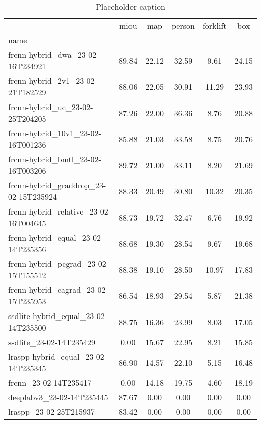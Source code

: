 \begin{table}[H]
\centering
\caption{Placeholder caption}
\label{tab:test-set}
\begin{tabular}{lccccc}
\toprule
 & miou & map & person & forklift & box \\
name &  &  &  &  &  \\
\midrule
frcnn-hybrid_dwa_23-02-16T234921 & 89.84 & 22.12 & 32.59 & 9.61 & 24.15 \\
frcnn-hybrid_2v1_23-02-21T182529 & 88.06 & 22.05 & 30.91 & 11.29 & 23.93 \\
frcnn-hybrid_uc_23-02-25T204205 & 87.26 & 22.00 & 36.36 & 8.76 & 20.88 \\
frcnn-hybrid_10v1_23-02-16T001236 & 85.88 & 21.03 & 33.58 & 8.75 & 20.76 \\
frcnn-hybrid_bmtl_23-02-16T003206 & 89.72 & 21.00 & 33.11 & 8.20 & 21.69 \\
frcnn-hybrid_graddrop_23-02-15T235924 & 88.33 & 20.49 & 30.80 & 10.32 & 20.35 \\
frcnn-hybrid_relative_23-02-16T004645 & 88.73 & 19.72 & 32.47 & 6.76 & 19.92 \\
frcnn-hybrid_equal_23-02-14T235356 & 88.68 & 19.30 & 28.54 & 9.67 & 19.68 \\
frcnn-hybrid_pcgrad_23-02-15T155512 & 88.38 & 19.10 & 28.50 & 10.97 & 17.83 \\
frcnn-hybrid_cagrad_23-02-15T235953 & 86.54 & 18.93 & 29.54 & 5.87 & 21.38 \\
ssdlite-hybrid_equal_23-02-14T235500 & 88.75 & 16.36 & 23.99 & 8.03 & 17.05 \\
ssdlite_23-02-14T235429 & 0.00 & 15.67 & 22.95 & 8.21 & 15.85 \\
lraspp-hybrid_equal_23-02-14T235345 & 86.90 & 14.57 & 22.10 & 5.15 & 16.48 \\
frcnn_23-02-14T235417 & 0.00 & 14.18 & 19.75 & 4.60 & 18.19 \\
deeplabv3_23-02-14T235445 & 87.67 & 0.00 & 0.00 & 0.00 & 0.00 \\
lraspp_23-02-25T215937 & 83.42 & 0.00 & 0.00 & 0.00 & 0.00 \\
\bottomrule
\end{tabular}
\end{table}
